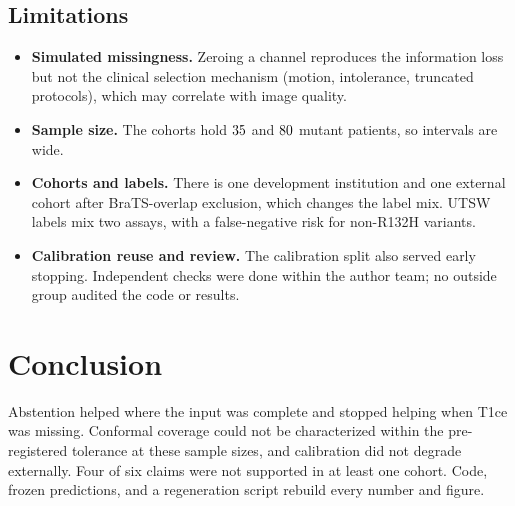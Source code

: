 \documentclass[conference]{IEEEtran}
\begin{document}
\subsection{Limitations}
\begin{itemize}
\item \textbf{Simulated missingness.} Zeroing a channel reproduces the information loss but not the clinical selection mechanism (motion, intolerance, truncated protocols), which may correlate with image quality.
\item \textbf{Sample size.} The cohorts hold $35$ and $80$ mutant patients, so intervals are wide.
\item \textbf{Cohorts and labels.} There is one development institution and one external cohort after BraTS-overlap exclusion, which changes the label mix. UTSW labels mix two assays, with a false-negative risk for non-R132H variants.
\item \textbf{Calibration reuse and review.} The calibration split also served early stopping. Independent checks were done within the author team; no outside group audited the code or results.
\end{itemize}

\section{Conclusion}
Abstention helped where the input was complete and stopped helping when T1ce was missing. Conformal coverage could not be characterized within the pre-registered tolerance at these sample sizes, and calibration did not degrade externally. Four of six claims were not supported in at least one cohort. Code, frozen predictions, and a regeneration script rebuild every number and figure.
\end{document}
